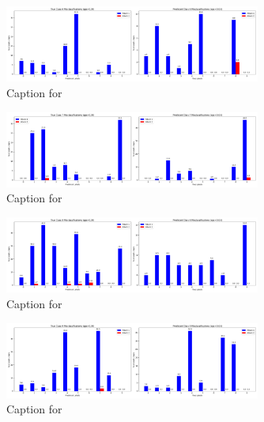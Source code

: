 \documentclass{article}
\begin{document}
\begin{figure}[!htbp]
\centering
\includegraphics[width=0.75\textwidth]{combined_class_boundary_pgd/combined_class_6_misclassifications_eps_0.04.png}
\caption{Caption for }
\label{fig:combined_class_6_misclassifications_eps_0.04.png}
\end{figure}

\begin{figure}[!htbp]
\centering
\includegraphics[width=0.75\textwidth]{combined_class_boundary_pgd/combined_class_7_misclassifications_eps_0.04.png}
\caption{Caption for }
\label{fig:combined_class_7_misclassifications_eps_0.04.png}
\end{figure}

\begin{figure}[!htbp]
\centering
\includegraphics[width=0.75\textwidth]{combined_class_boundary_pgd/combined_class_8_misclassifications_eps_0.04.png}
\caption{Caption for }
\label{fig:combined_class_8_misclassifications_eps_0.04.png}
\end{figure}

\begin{figure}[!htbp]
\centering
\includegraphics[width=0.75\textwidth]{combined_class_boundary_pgd/combined_class_9_misclassifications_eps_0.04.png}
\caption{Caption for }
\label{fig:combined_class_9_misclassifications_eps_0.04.png}
\end{figure}
\end{document}
